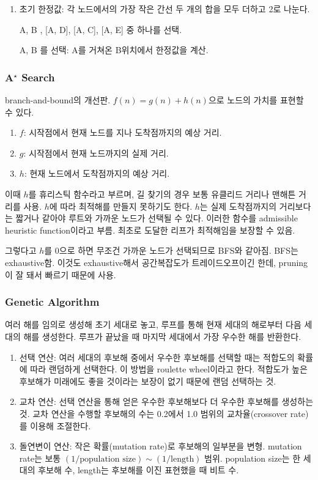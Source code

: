 \begin{enumerate}
  \item 초기 한정값: 각 노드에서의 가장 작은 간선 두 개의 합을 모두 더하고 2로 나눈다.
  \item [A, B], [A, D], [A, C], [A, E] 중 하나를 선택.
  \item [A, B]를 선택: A를 거쳐온 B위치에서 한정값을 계산.
\end{enumerate}

\subsubsection{A$^\star$ Search}

branch-and-bound의 개선판. $f(n) = g(n) + h(n)$으로 노드의 가치를 표현할 수 있다.

\begin{enumerate}
  \item $f$: 시작점에서 현재 노드를 지나 도착점까지의 예상 거리.
  \item $g$: 시작점에서 현재 노드까지의 실제 거리.
  \item $h$: 현재 노드에서 도착점까지의 예상 거리.
\end{enumerate}

이때 $h$를 휴리스틱 함수라고 부르며, 길 찾기의 경우 보통 유클리드 거리나 맨해튼 거리를 사용. $h$에 따라 최적해를 만들지 못하기도 한다. $h$는 실제 도착점까지의 거리보다는 짧거나 같아야 루트와 가까운 노드가 선택될 수 있다. 이러한 함수를 admissible heuristic function이라고 부름. 최초로 도달한 리프가 최적해임을 보장할 수 있음.

그렇다고 $h$를 0으로 하면 무조건 가까운 노드가 선택되므로 BFS와 같아짐. BFS는exhaustive함. 이것도 exhaustive해서 공간복잡도가 트레이드오프이긴 한데, pruning이 잘 돼서 빠르기 때문에 사용.

\subsubsection{Genetic Algorithm}

여러 해를 임의로 생성해 초기 세대로 놓고, 루프를 통해 현재 세대의 해로부터 다음 세대의 해를 생성한다. 루프가 끝났을 때 마지막 세대에서 가장 우수한 해를 반환한다.

\begin{enumerate}
  \item 선택 연산: 여러 세대의 후보해 중에서 우수한 후보해를 선택할 때는 적합도의 확률에 따라 랜덤하게 선택한다. 이 방법을 roulette wheel이라고 한다. 적합도가 높은 후보해가 미래에도 좋을 것이라는 보장이 없기 때문에 랜덤 선택하는 것.
  \item 교차 연산: 선택 연산을 통해 얻은 우수한 후보해보다 더 우수한 후보해를 생성하는 것. 교차 연산을 수행할 후보해의 수는 0.2에서 1.0 범위의 교차율(crossover rate)를 이용해 조절한다.
  \item 돌연변이 연산: 작은 확률(mutation rate)로 후보해의 일부분을 변형. mutation rate는 보통 $(1 / \text{population size}) \sim (1 / \text{length})$ 범위. population size는 한 세대의 후보해 수, length는 후보해를 이진 표현했을 때 비트 수.
\end{enumerate}

